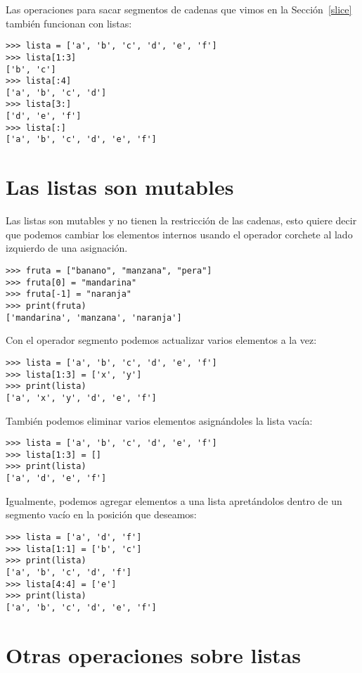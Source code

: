  

Las operaciones para sacar segmentos de cadenas que vimos en la Sección~\ref{slice}
también funcionan con listas:
\begin{lstlisting}
>>> lista = ['a', 'b', 'c', 'd', 'e', 'f']
>>> lista[1:3]
['b', 'c']
>>> lista[:4]
['a', 'b', 'c', 'd']
>>> lista[3:]
['d', 'e', 'f']
>>> lista[:]
['a', 'b', 'c', 'd', 'e', 'f']
\end{lstlisting}

\section{Las listas son mutables}

 

Las listas son mutables y no tienen la restricción de las cadenas,
esto quiere decir que podemos cambiar los elementos internos usando
el operador corchete al lado izquierdo de una asignación.
\begin{lstlisting}
>>> fruta = ["banano", "manzana", "pera"]
>>> fruta[0] = "mandarina"
>>> fruta[-1] = "naranja"
>>> print(fruta)
['mandarina', 'manzana', 'naranja']
\end{lstlisting}
 Con el operador segmento podemos actualizar varios elementos a la
vez:
\begin{lstlisting}
>>> lista = ['a', 'b', 'c', 'd', 'e', 'f']
>>> lista[1:3] = ['x', 'y']
>>> print(lista)
['a', 'x', 'y', 'd', 'e', 'f']
\end{lstlisting}

También podemos eliminar varios elementos asignándoles la lista vacía:
\begin{lstlisting}
>>> lista = ['a', 'b', 'c', 'd', 'e', 'f']
>>> lista[1:3] = []
>>> print(lista)
['a', 'd', 'e', 'f']
\end{lstlisting}

Igualmente, podemos agregar elementos a una lista apretándolos dentro
de un segmento vacío en la posición que deseamos:
\begin{lstlisting}
>>> lista = ['a', 'd', 'f']
>>> lista[1:1] = ['b', 'c']
>>> print(lista)
['a', 'b', 'c', 'd', 'f']
>>> lista[4:4] = ['e']
>>> print(lista)
['a', 'b', 'c', 'd', 'e', 'f']
\end{lstlisting}

\section{Otras operaciones sobre listas}

